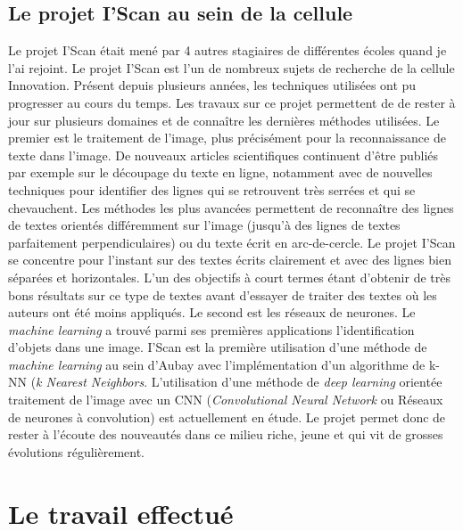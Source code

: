 \documentclass[12pt,a4paper]{article}
\begin{document}
\subsection{Le projet I'Scan au sein de la cellule}
Le projet I’Scan était mené par 4 autres stagiaires de différentes écoles quand je l’ai rejoint.\bigbreak
Le projet I’Scan est l’un de nombreux sujets de recherche de la cellule Innovation. Présent depuis plusieurs années, les techniques utilisées ont pu progresser au cours du temps. Les travaux sur ce projet permettent de de rester à jour sur plusieurs domaines et de connaître les dernières méthodes utilisées.\bigbreak
Le premier est le traitement de l’image, plus précisément pour la reconnaissance de texte dans l’image. De nouveaux articles scientifiques continuent d’être publiés par exemple sur le découpage du texte en ligne, notamment avec de nouvelles techniques pour identifier des lignes qui se retrouvent très serrées et qui se chevauchent. Les méthodes les plus avancées permettent de reconnaître des lignes de textes orientés différemment sur l’image (jusqu’à des lignes de textes parfaitement perpendiculaires) ou du texte écrit en arc-de-cercle. Le projet I’Scan se concentre pour l’instant sur des textes écrits clairement et avec des lignes bien séparées et horizontales. L’un des objectifs à court termes étant d’obtenir de très bons résultats sur ce type de textes avant d’essayer de traiter des textes où les auteurs ont été moins appliqués.\bigbreak
Le second est les réseaux de neurones. Le \textit{machine learning} a trouvé parmi ses premières applications l’identification d’objets dans une image. I’Scan est la première utilisation d’une méthode de \textit{machine learning} au sein d’Aubay avec l'implémentation d'un algorithme de k-NN (\textit{k Nearest Neighbors}. L'utilisation d'une méthode de \textit{deep learning} orientée traitement de l'image avec un CNN (\textit{Convolutional Neural Network} ou Réseaux de neurones à convolution) est actuellement en étude. Le projet permet donc de rester à l’écoute des nouveautés dans ce milieu riche, jeune et qui vit de grosses évolutions régulièrement.

\newpage
\section{Le travail effectué}
\end{document}
